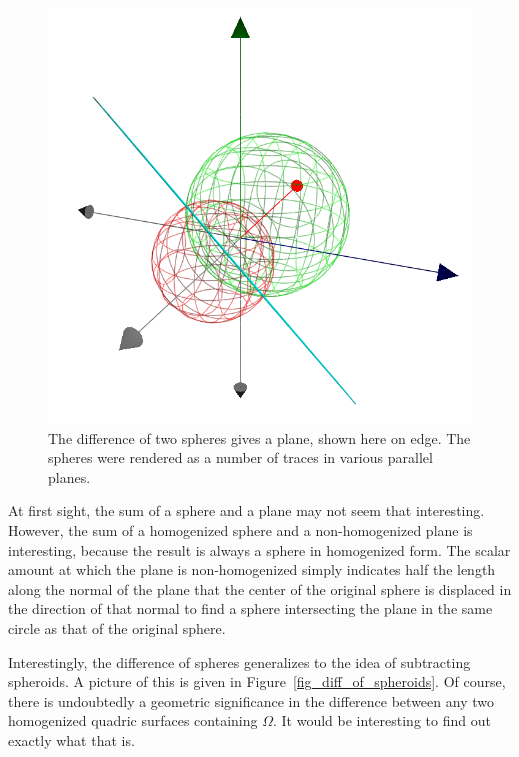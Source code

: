 \documentclass{ecgd-l}
\theoremstyle{definition}
\theoremstyle{remark}
\numberwithin{equation}{section}
\begin{document}
\begin{figure}
\includegraphics[scale=0.7]{DiffOfSpheres}
\caption{The difference of two spheres gives a plane, shown here on edge.  The spheres were rendered as a number of traces in various parallel planes.}
\label{fig_diff_of_spheres}
\end{figure}

At first sight, the sum of a sphere and a plane may not seem that interesting.
However, the sum of a homogenized sphere and a non-homogenized plane is
interesting, because the result is always a sphere in homogenized form.  The
scalar amount at which the plane is non-homogenized simply indicates half
the length along the normal of the plane that the center of the original sphere
is displaced in the direction of that normal to find a sphere intersecting the
plane in the same circle as that of the original sphere.

Interestingly, the difference of spheres generalizes to the idea of subtracting
spheroids.  A picture of this is given in Figure~\ref{fig_diff_of_spheroids}.
Of course, there is undoubtedly a geometric significance in the difference
between any two homogenized quadric surfaces containing $\Omega$.  It
would be interesting to find out exactly what that is.
\end{document}
